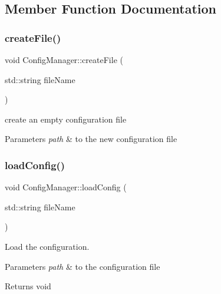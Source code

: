 \subsection{Member Function Documentation}
\mbox{\label{classConfigManager_a4f2b06f2ef741a15b3dfe82259cfd355}} 
\subsubsection{\texorpdfstring{create\+File()}{createFile()}}
{\footnotesize\ttfamily void Config\+Manager\+::create\+File (\begin{DoxyParamCaption}\item[{std\+::string}]{file\+Name }\end{DoxyParamCaption})}



create an empty configuration file 


\begin{DoxyParams}{Parameters}
{\em path} & to the new configuration file \\
\hline
\end{DoxyParams}
\mbox{\label{classConfigManager_a63ff6c831f037cf5bfe580b4944b0b6c}} 
\subsubsection{\texorpdfstring{load\+Config()}{loadConfig()}}
{\footnotesize\ttfamily void Config\+Manager\+::load\+Config (\begin{DoxyParamCaption}\item[{std\+::string}]{file\+Name }\end{DoxyParamCaption})}



Load the configuration. 


\begin{DoxyParams}{Parameters}
{\em path} & to the configuration file \\
\hline
\end{DoxyParams}
\begin{DoxyReturn}{Returns}
void 
\end{DoxyReturn}


